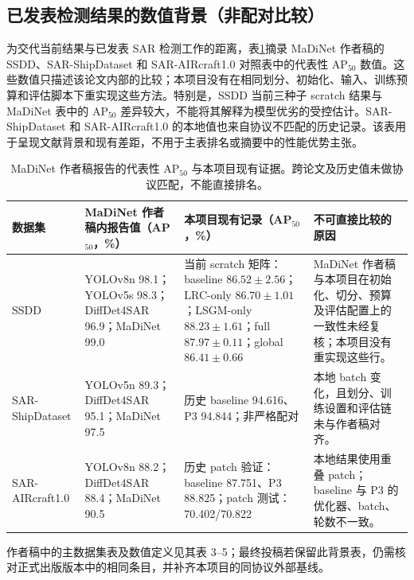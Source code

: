 \documentclass[UTF8,12pt,a4paper]{ctexart}
\begin{document}
\subsection{已发表检测结果的数值背景（非配对比较）}
为交代当前结果与已发表 SAR 检测工作的距离，表\ref{tab:literature_context}摘录 MaDiNet 作者稿的 SSDD、SAR-ShipDataset 和 SAR-AIRcraft1.0 对照表中的代表性 AP$_{50}$ 数值\cite{madinet_preprint}。这些数值只描述该论文内部的比较；本项目没有在相同划分、初始化、输入、训练预算和评估脚本下重实现这些方法。特别是，SSDD 当前三种子 scratch 结果与 MaDiNet 表中的 AP$_{50}$ 差异较大，不能将其解释为模型优劣的受控估计。SAR-ShipDataset 和 SAR-AIRcraft1.0 的本地值也来自协议不匹配的历史记录。该表用于呈现文献背景和现有差距，不用于主表排名或摘要中的性能优势主张。
\begin{table}[H]\centering\scriptsize
\caption{MaDiNet 作者稿报告的代表性 AP$_{50}$ 与本项目现有证据。跨论文及历史值未做协议匹配，不能直接排名。}
\label{tab:literature_context}
\begin{tabularx}{\linewidth}{p{1.65cm}XXp{3.45cm}}
\toprule
数据集 & MaDiNet 作者稿内报告值（AP$_{50}$，\%） & 本项目现有记录（AP$_{50}$，\%） & 不可直接比较的原因\\
\midrule
SSDD & YOLOv8n 98.1；YOLOv5s 98.3；DiffDet4SAR 96.9；MaDiNet 99.0 & 当前 scratch 矩阵：baseline $86.52\pm2.56$；LRC-only $86.70\pm1.01$；LSGM-only $88.23\pm1.61$；full $87.97\pm0.11$；global $86.41\pm0.66$ & MaDiNet 作者稿与本项目在初始化、切分、预算及评估配置上的一致性未经复核；本项目没有重实现这些行。\\
SAR-ShipDataset & YOLOv5n 89.3；DiffDet4SAR 95.1；MaDiNet 97.5 & 历史 baseline 94.616、P3 94.844；非严格配对 & 本地 batch 变化，且划分、训练设置和评估链未与作者稿对齐。\\
SAR-AIRcraft1.0 & YOLOv8n 88.2；DiffDet4SAR 88.4；MaDiNet 90.5 & 历史 patch 验证：baseline 87.751、P3 88.825；patch 测试：70.402/70.822 & 本地结果使用重叠 patch；baseline 与 P3 的优化器、batch、轮数不一致。\\
\bottomrule
\end{tabularx}
\end{table}
作者稿中的主数据集表及数值定义见其表 3--5；最终投稿若保留此背景表，仍需核对正式出版版本中的相同条目，并补齐本项目的同协议外部基线。
\end{document}
